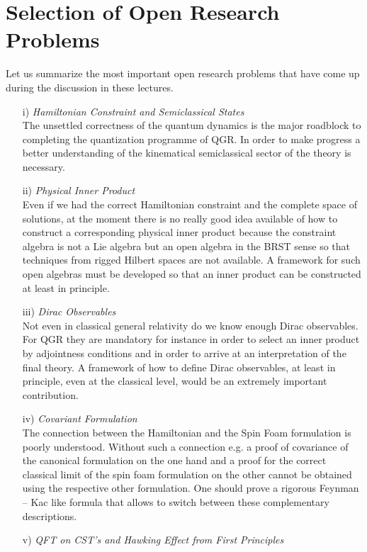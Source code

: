 \documentclass[12pt]{report}
\begin{document}
\part{Selection of Open Research Problems}
\label{s4}

Let us summarize the most important open research problems that have 
come up during the discussion in these lectures.
%
\begin{itemize}
%
\item[i)] {\it Hamiltonian Constraint and Semiclassical States}\\
The unsettled correctness of the quantum dynamics is the major roadblock
to completing the quantization programme of QGR. In order to make 
progress a better understanding of the kinematical semiclassical 
sector of the theory is necessary.
%
\item[ii)] {\it Physical Inner Product}\\
Even if we had the correct Hamiltonian constraint and the complete space 
of solutions, at the moment there is no really good idea available of 
how to construct a corresponding physical inner product  
because the constraint algebra is not a Lie algebra but
an open algebra in the BRST sense so that techniques from rigged 
Hilbert spaces are not available. A framework for such open algebras 
must be developed so that an inner product can be constructed at least
in principle.
%
\item[iii)] {\it Dirac Observables}\\
Not even in classical general relativity do we know enough Dirac observables.
For QGR they are mandatory for instance in order to select an inner 
product by adjointness conditions and in order to arrive at an 
interpretation of the final theory. A framework of how to define 
Dirac observables, at least in principle, even at the classical level,
would be an extremely important contribution. 
%
\item[iv)] {\it Covariant Formulation}\\
The connection between the Hamiltonian and the Spin Foam formulation is 
poorly understood. Without such a connection e.g. a proof of covariance of 
the canonical formulation on the one hand and a proof for the correct
classical limit of the spin foam formulation on the other cannot be 
obtained using the respective other formulation.
One should prove a rigorous Feynman -- Kac like formula that allows to 
switch between these complementary descriptions.
%
\item[v)] {\it QFT on CST's and Hawking Effect from First Principles}\\

\end{itemize}
\end{document}
